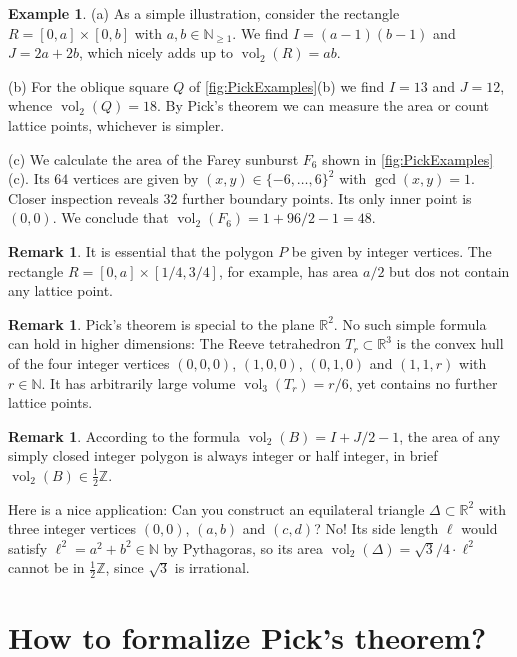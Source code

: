 \documentclass[a4paper]{amsart}
\numberwithin{equation}{section}
\theoremstyle{plain}
\theoremstyle{definition}
\newtheorem{remark}[theorem]{Remark}
\newtheorem{example}[theorem]{Example}
\newcommand{\N}{\mathbb{N}}
\newcommand{\Z}{\mathbb{Z}}
\newcommand{\R}{\mathbb{R}}
\DeclareMathOperator{\vol}{vol}
\begin{document}
\begin{example}
  (a) As a simple illustration, consider %
  the rectangle $R = [0,a] \times [0,b]$ with $a,b \in \N_{\ge1}$.
  We find $I = (a-1) (b-1)$ and $J = 2 a + 2 b$,
  which nicely adds up to $\vol_2(R) = a b$.

  (b) For the oblique square $Q$ of \autoref{fig:PickExamples}(b) 
  we find $I = 13$ and $J = 12$, whence $\vol_2(Q) = 18$.
  By Pick's theorem we can measure the area
  or count lattice points, whichever is simpler.
  
  (c) We calculate the area of the Farey sunburst $F_6$ shown in \autoref{fig:PickExamples}(c).
  Its $64$ vertices are given by $(x,y) \in \{-6,\dots,6\}^2$ with $\gcd(x,y) = 1$.
  Closer inspection reveals $32$ further boundary points. Its only inner point is $(0,0)$.
  We conclude that $\vol_2(F_6) = 1 + 96/2 - 1 = 48$.
\end{example}

\begin{remark}
  It is essential that the polygon $P$ be given by integer vertices.
  The rectangle $R = [0,a] \times [1/4,3/4]$, for example,
  has area $a/2$ but dos not contain any lattice point.
\end{remark}

\begin{remark}
  Pick's theorem is special to the plane $\R^2$.
  No such simple formula can hold in higher dimensions:
  The Reeve tetrahedron $T_r \subset \R^3$ is the convex
  hull of the four integer vertices $(0,0,0)$, $(1,0,0)$, $(0,1,0)$
  and $(1,1,r)$ with $r \in \N$.
  It has arbitrarily large volume $\vol_3(T_r) = r/6$,
  yet contains no further lattice points.
\end{remark}

\begin{remark}
  According to the formula $\vol_2(B) = I + J/2 - 1$,
  the area of any simply closed integer polygon
  is always integer or half integer,
  in brief $\vol_2(B) \in \frac{1}{2} \Z$.

  Here is a nice application: %
  Can you construct an equilateral triangle $\Delta \subset \R^2$
  with three integer vertices $(0,0)$, $(a,b)$ and $(c,d)$?
  No!  Its side length $\ell$ would satisfy $\ell^2 = a^2 + b^2 \in \N$ by Pythagoras,
  so its area $\vol_2(\Delta) = \sqrt{3}/4 \cdot \ell^2$
  cannot be in $\frac{1}{2} \Z$, since $\sqrt{3}$ is irrational.
\end{remark}


\section{How to formalize Pick's theorem?}
\end{document}
